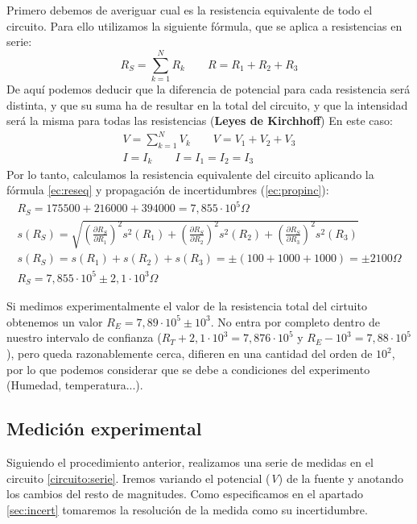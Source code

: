 \documentclass[12pt, a4paper, titlepage]{article}
\begin{document}
  Primero debemos de averiguar cual es la resistencia equivalente de todo el circuito. Para ello utilizamos la siguiente fórmula, que se aplica a resistencias en serie:
  \begin{equation} \label{ec:reseq}
    R_S = \sum_{k=1}^N R_k \qquad R = R_1 + R_2 + R_3
  \end{equation}
  De aquí podemos deducir que la diferencia de potencial para cada resistencia será distinta, y que su suma ha de resultar en la total del circuito, y que la intensidad será la misma para todas las resistencias (\textbf{Leyes de Kirchhoff}) En este caso:
  \begin{gather}
    V = \sum_{k=1}^N V_k \qquad V = V_1 + V_2 + V_3 \nonumber \\
    I = I_k \qquad I = I_1 = I_2 = I_3 \label{ec:kriser}
  \end{gather}
  Por lo tanto, calculamos la resistencia equivalente del circuito aplicando la fórmula \ref{ec:reseq} y propagación de incertidumbres (\ref{ec:propinc}):
  \begin{gather}
    R_S = 175500 + 216000 + 394000 = 7,855 \cdot 10^5 \Omega \nonumber \\
    s(R_S) = \sqrt{\left ( \frac{\partial R_S}{\partial R_1} \right )^2 s^2(R_1) + \left ( \frac{\partial R_S}{\partial R_2} \right )^2 s^2(R_2) + \left ( \frac{\partial R_S}{\partial R_3} \right )^2 s^2(R_3)} \nonumber \\ s(R_S) = s(R_1) + s(R_2) + s(R_3) = \pm(100 + 1000 + 1000) = \pm2100 \Omega \nonumber \\ R_S = 7,855 \cdot 10^5 \pm 2,1 \cdot 10^3 \Omega \nonumber
  \end{gather}

  Si medimos experimentalmente el valor de la resistencia total del cirtuito obtenemos un valor $R_E = 7,89 \cdot 10^5 \pm 10^3$. No entra por completo dentro de nuestro intervalo de confianza ($R_T + 2,1 \cdot 10^3 = 7,876 \cdot 10^5$ y $R_E - 10^3 = 7,88 \cdot 10^5$), pero queda razonablemente cerca, difieren en una cantidad del orden de $10^2$, por lo que podemos considerar que se debe a condiciones del experimento (Humedad, temperatura...).

  \subsection{Medición experimental}

  Siguiendo el procedimiento anterior, realizamos una serie de medidas en el circuito \ref{circuito:serie}. Iremos variando el potencial (\textit{V}) de la fuente y anotando los cambios del resto de magnitudes. Como especificamos en el apartado \ref{sec:incert} tomaremos la resolución de la medida como su incertidumbre.
\end{document}
